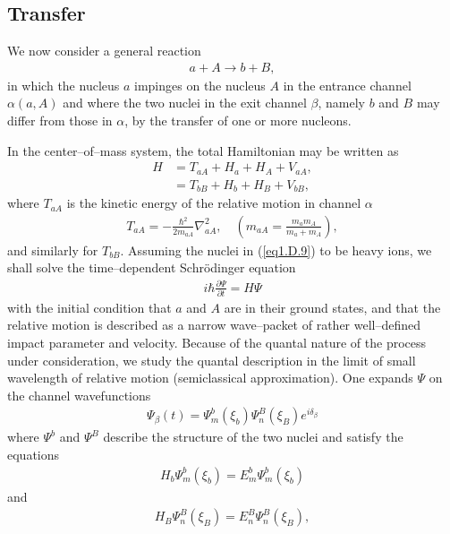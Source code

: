 \begin{subappendices}
\subsection{Transfer}
We now consider a general reaction
\begin{align}\label{eq1.D.9}
a+A\rightarrow b+B,
\end{align}
in which the nucleus $a$ impinges on the nucleus $A$ in the entrance channel $\alpha(a,A)$ and where the two nuclei in the exit channel $\beta$, namely $b$ and $B$ may differ from those in $\alpha$, by the transfer of one or more nucleons.




In the center--of--mass system, the total Hamiltonian may be written as 
\begin{align}\label{eq1.D.10}
\nonumber H&=T_{aA}+H_a+H_A+V_{aA},\\
&=T_{bB}+H_b+H_B+V_{bB},
\end{align}
where $T_{aA}$ is the kinetic energy of the relative motion in channel $\alpha$
\begin{align}\label{eq1.D.11}
T_{aA}=-\frac{\hbar^2}{2m_{aA}}\nabla^2_{aA},\quad (m_{aA}=\frac{m_am_A}{m_a+m_A}),
\end{align}
and similarly for $T_{bB}$. Assuming the nuclei in (\ref{eq1.D.9}) to be heavy ions, we shall solve the time--dependent Schr\"odinger equation
\begin{align}\label{eq1.D.12}
i\hbar\frac{\partial\Psi}{\partial t}=H\Psi
\end{align}
with the initial condition that $a$ and $A$ are in their ground states, and that the relative motion is described as a narrow wave--packet of rather well--defined impact parameter and velocity. Because of the quantal nature of the process under consideration, we study the quantal description in the limit of small wavelength of relative motion (semiclassical approximation). One expands $\Psi$ on the channel wavefunctions
\begin{align}\label{eq1.D.13}
\Psi_\beta(t)=\Psi_m^b(\xi_b)\Psi_n^B(\xi_B)e^{i\delta_\beta}
\end{align}
where $\Psi^b$ and $\Psi^B$ describe the structure of the two nuclei and satisfy the equations 
\begin{align}\label{eq1.D.14}
H_b\Psi_m^b(\xi_b)=E_m^b\Psi_m^b(\xi_b)
\end{align}
and
\begin{align}\label{eq1.D.15}
H_B\Psi_n^B(\xi_B)=E_n^B\Psi_n^B(\xi_B),
\end{align}

\end{subappendices}
